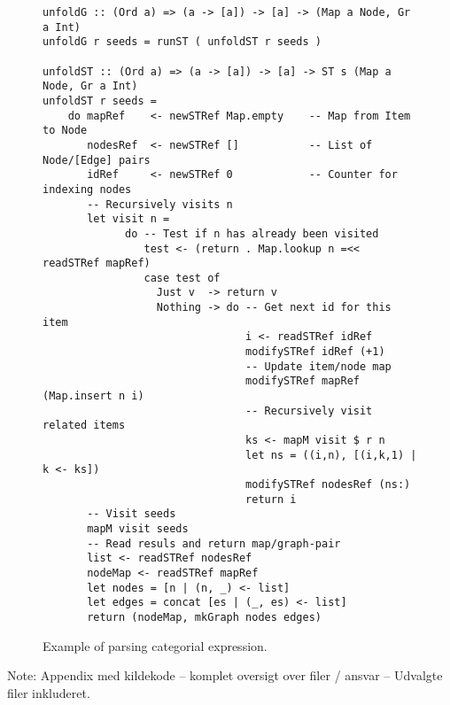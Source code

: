 \begin{figure}[ht]
\begin{cframed}{\textwidth}
\begin{lstlisting}[language=GHC]
unfoldG :: (Ord a) => (a -> [a]) -> [a] -> (Map a Node, Gr a Int)
unfoldG r seeds = runST ( unfoldST r seeds )

unfoldST :: (Ord a) => (a -> [a]) -> [a] -> ST s (Map a Node, Gr a Int)
unfoldST r seeds =
    do mapRef    <- newSTRef Map.empty    -- Map from Item to Node
       nodesRef  <- newSTRef []           -- List of Node/[Edge] pairs
       idRef     <- newSTRef 0            -- Counter for indexing nodes
       -- Recursively visits n
       let visit n = 
             do -- Test if n has already been visited
                test <- (return . Map.lookup n =<< readSTRef mapRef)
                case test of
                  Just v  -> return v
                  Nothing -> do -- Get next id for this item
                                i <- readSTRef idRef
                                modifySTRef idRef (+1)
                                -- Update item/node map
                                modifySTRef mapRef (Map.insert n i)
                                -- Recursively visit related items
                                ks <- mapM visit $ r n 
                                let ns = ((i,n), [(i,k,1) | k <- ks])
                                modifySTRef nodesRef (ns:)
                                return i
       -- Visit seeds
       mapM visit seeds
       -- Read resuls and return map/graph-pair
       list <- readSTRef nodesRef         
       nodeMap <- readSTRef mapRef
       let nodes = [n | (n, _) <- list]
       let edges = concat [es | (_, es) <- list]
       return (nodeMap, mkGraph nodes edges)
\end{lstlisting}  
\end{cframed}
\caption{Example of parsing categorial expression.}
\label{fig:categoryExpression}
\end{figure}




Note: Appendix med kildekode -- komplet oversigt over filer / ansvar -- Udvalgte filer inkluderet.

